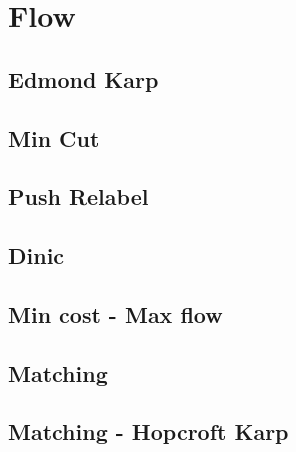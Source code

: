 \newpage
\section{Flow}
\subsection{Edmond Karp}

\subsection{Min Cut}

\subsection{Push Relabel}

\subsection{Dinic}

\subsection{Min cost - Max flow}

\subsection{Matching}

\subsection{Matching - Hopcroft Karp}

